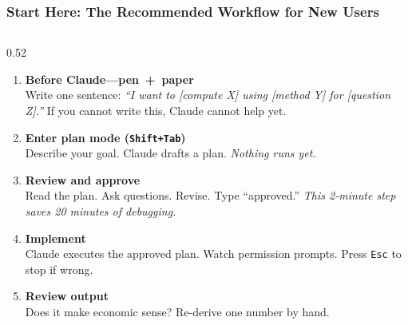 \documentclass[10pt,english,aspectratio=169]{beamer}
\begin{document}
\begin{frame}
\frametitle{Start Here: The Recommended Workflow for New Users}

\begin{columns}[T]
\begin{column}{0.52\textwidth}
\small
\begin{enumerate}
    \item[\textbf{0.}] \textbf{Before Claude---pen~+~paper}\\
    Write one sentence: \textit{``I want to [compute X] using [method Y] for [question Z].''} If you cannot write this, Claude cannot help yet.

    \vspace{0.1cm}

    \item[\textbf{1.}] \textbf{Enter plan mode (\texttt{Shift+Tab})}\\
    Describe your goal. Claude drafts a plan. \textit{Nothing runs yet.}

    \vspace{0.1cm}

    \item[\textbf{2.}] \textbf{Review and approve}\\
    Read the plan. Ask questions. Revise. Type ``approved.'' \textit{This 2-minute step saves 20 minutes of debugging.}

    \vspace{0.1cm}

    \item[\textbf{3.}] \textbf{Implement}\\
    Claude executes the approved plan. Watch permission prompts. Press \texttt{Esc} to stop if wrong.

    \vspace{0.1cm}

    \item[\textbf{4.}] \textbf{Review output}\\
    Does it make economic sense? Re-derive one number by hand.

    \vspace{0.1cm}


\end{enumerate}
\end{column}
\end{columns}
\end{frame}
\end{document}
